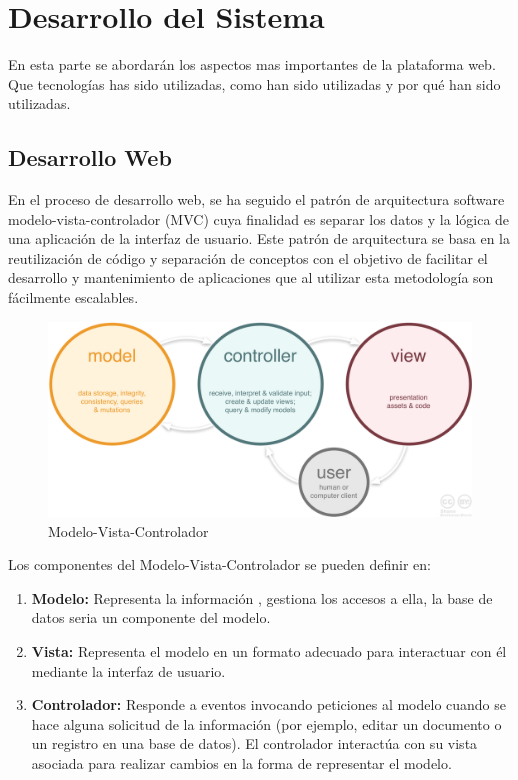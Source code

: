 \documentclass[a4paper,11pt]{book}
\begin{document}
\chapter{Desarrollo del Sistema}
En esta parte se abordarán los aspectos mas importantes de la plataforma web. Que tecnologías has sido utilizadas, como han sido utilizadas y por qué han sido utilizadas.


\section{Desarrollo Web}

En el proceso de desarrollo web, se ha seguido el patrón de arquitectura software modelo-vista-controlador (MVC)\cite{mvc} cuya finalidad es separar los datos y la lógica de una aplicación de la interfaz de usuario. Este patrón de arquitectura se basa en la reutilización de código y separación de conceptos con el objetivo de facilitar el desarrollo y mantenimiento de aplicaciones que al utilizar esta metodología son fácilmente escalables. 

\begin{figure}[H] 
\centering 
\includegraphics[scale=0.25]{imagenes/desarrollo_herramienta/mvc.png}
\caption{ Modelo-Vista-Controlador\cite{mvc2}  }  
\end{figure} 

Los componentes\cite{mvc3}\cite{mvc4} del Modelo-Vista-Controlador se pueden definir en:

\begin{enumerate}
\item \textbf{Modelo:} Representa la información , gestiona los accesos a ella, la base de datos seria un componente del modelo. 

\item \textbf{Vista:} Representa el modelo en un formato adecuado para interactuar con él mediante la interfaz de usuario.  

\item \textbf{Controlador:} Responde a eventos invocando peticiones al modelo cuando se hace alguna solicitud de la información (por ejemplo, editar un documento o un registro en una base de datos). El controlador interactúa con su vista asociada para realizar cambios en la forma de representar el modelo. 
\end{enumerate}
\end{document}
